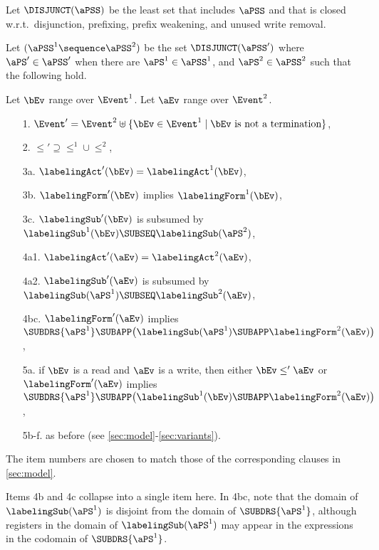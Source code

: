 \begin{definition}
  \label{def:semi:seq}
  Let $\DISJUNCT(\aPSS)$ be the least set that
  includes $\aPSS$ and that is closed w.r.t.~disjunction, prefixing, prefix weakening, and
  unused write removal.                  

  Let $(\aPSS^1 \sequence \aPSS^2)$ be the set
  \begin{math}
    \DISJUNCT(\aPSS')
  \end{math}
  where $\aPS'\in\aPSS'$ when there are $\aPS^1 \in \aPSS^1$,
  and $\aPS^2\in\aPSS^2$
  such that the following hold.

Let $\bEv$ range over $\Event^1$.  Let $\aEv$ range over $\Event^2$.  
      
\begin{enumerate}
\item[1.] $\Event' = \Event^2 \uplus \{\bEv\in\Event^1\mid\bEv\text{ is not a termination}\}$,
\item[2.] ${\le'}\supseteq{\le^1}\cup{\le^2}$, 
\item[3a.] $\labelingAct'(\bEv) = \labelingAct^1(\bEv)$,
\item[3b.] $\labelingForm'(\bEv)$ implies $\labelingForm^1(\bEv)$,
\item[3c.] $\labelingSub'(\bEv)$ is subsumed by $\labelingSub^1(\bEv)\SUBSEQ \labelingSub(\aPS^2)$,
\item[4a1.] $\labelingAct'(\aEv) = \labelingAct^2(\aEv)$,
\item[4a2.] $\labelingSub'(\aEv)$ is subsumed by $\labelingSub(\aPS^1)\SUBSEQ\labelingSub^2(\aEv)$,
\item[4bc.] $\labelingForm'(\aEv)$ implies
  $\SUBDRS{\aPS^1} \SUBAPP \bigl(\labelingSub(\aPS^1)\SUBAPP\labelingForm^2(\aEv)\bigr)$, 
\item[5a.] if $\bEv$ is a read and $\aEv$ is a write,
  then either $\bEv\le'\aEv$ or $\labelingForm'(\aEv)$ implies $\SUBDRS{\aPS^1}\SUBAPP \bigl(\labelingSub^1(\bEv)\SUBAPP\labelingForm^2(\aEv)\bigr)$,
\item[5b-f.] as before (see \textsection\ref{sec:model}-\ref{sec:variants}). %
\end{enumerate}
\end{definition}

The item numbers are chosen to match those of the corresponding clauses in
\textsection\ref{sec:model}.  

Items 4b and 4c collapse into a single item here.
In 4bc, note that the domain of $\labelingSub(\aPS^1)$ is disjoint from the domain
of $\SUBDRS{\aPS^1}$, although registers in the domain of $\labelingSub(\aPS^1)$ may
appear in the expressions in the codomain of $\SUBDRS{\aPS^1}$.

